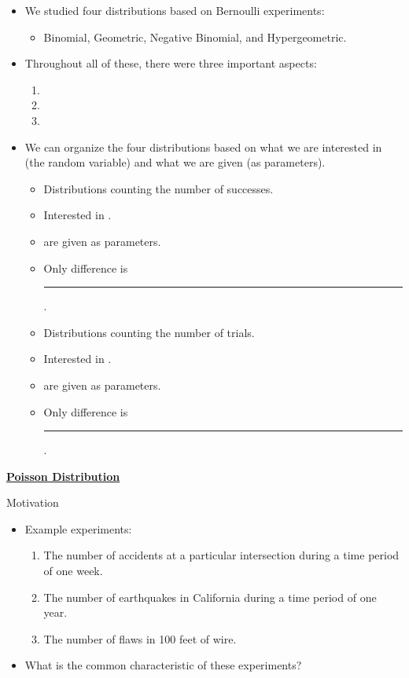 \documentclass{article}
\newcommand{\bu}[1]{\textbf{\ul{#1}}}				%
\newcommand{\blankul}[1]{\rule[-1.5mm]{#1}{0.15mm}}	%
\begin{document}
\begin{itemize}
    \item We studied four distributions based on Bernoulli experiments:
    \begin{itemize}
        \item Binomial, Geometric, Negative Binomial, and Hypergeometric.
    \end{itemize}\vspace{20pt}
    \item Throughout all of these, there were three important aspects:\bigskip
    \begin{enumerate}
        \item \smallskip
        \item \smallskip
        \item \smallskip
    \end{enumerate}\bigskip
    \item We can organize the four distributions based on what we are interested in (the random variable) and what we are given (as parameters).
    \begin{itemize}
        \item Distributions counting the number of successes.\vspace{20pt}
        \item[] Interested in \hspace{10pt}.
        \item[] \hspace{30pt} are given as parameters.
        \item[] Only difference is \blankul{5cm}.\bigskip
        \item Distributions counting the number of trials.\vspace{20pt}
        \item[] Interested in \hspace{10pt}.
        \item[] \hspace{30pt} are given as parameters.
        \item[] Only difference is \blankul{5cm}.
    \end{itemize}
\end{itemize}

\newpage

\bu{Poisson Distribution}\bigskip

Motivation\bigskip
\begin{itemize}
    \item Example experiments:
    \begin{enumerate}
        \item The number of accidents at a particular intersection during a time period of one week.
        \item The number of earthquakes in California during a time period of one year.
        \item The number of flaws in 100 feet of wire. 
    \end{enumerate}
    \item What is the common characteristic of these experiments?\bigskip
\end{itemize}\bigskip
\end{document}
